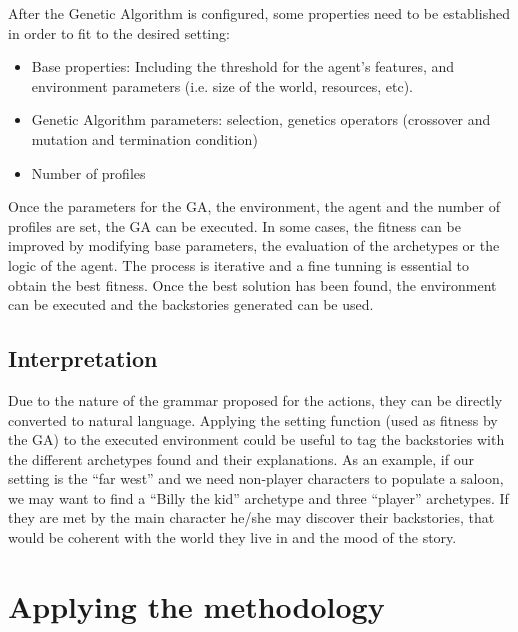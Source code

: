 \documentclass[letterpaper]{article}
\begin{document}
After the Genetic Algorithm is configured, some properties need to be established in order to fit to the desired setting:
\begin{itemize}
\item Base properties: Including the threshold for the agent's features, and environment parameters (i.e. size of the world, resources, etc).
\item Genetic Algorithm parameters: selection, genetics operators (crossover and mutation and termination condition)
\item Number of profiles
\end{itemize}

Once the parameters for the GA, the environment, the agent and the number of profiles are set, the GA can be executed. In some cases, the fitness can be improved by modifying base parameters, the evaluation of the archetypes or the logic of the agent. The process is iterative and a fine tunning is essential to obtain the best fitness. Once the best solution has been found, the environment can be executed and the backstories generated can be used.

\subsection{Interpretation}


Due to the nature of the grammar proposed for the actions, they can be directly converted to natural language. Applying the setting function (used as fitness by the GA) to the executed environment could be useful to tag the backstories with the different archetypes found and their explanations. As an example, if our setting is the ``far west'' and we need non-player characters to populate a saloon, we may want to find a ``Billy the kid'' archetype and three ``player'' archetypes. If they are met by the main character he/she may discover their backstories, that would be coherent with the world they live in and the mood of the story.




\section{Applying the methodology}
\label{sec:applying}
\end{document}
